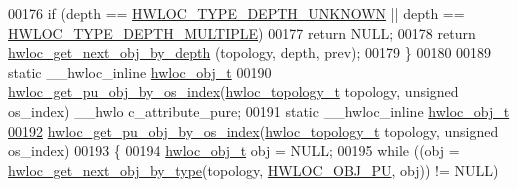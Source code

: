 \begin{DoxyCode}
00176   \textcolor{keywordflow}{if} (depth == \hyperlink{a00046_ggaf4e663cf42bbe20756b849c6293ef575a0565ab92ab72cb0cec91e23003294aad}{HWLOC_TYPE_DEPTH_UNKNOWN} || depth == \hyperlink{a00046_ggaf4e663cf42bbe20756b849c6293ef575ae99465995cacde6c210d5fc2e409798c}{HWLOC_TYPE_DEPTH_MULTIPLE})
00177     \textcolor{keywordflow}{return} NULL;
00178   \textcolor{keywordflow}{return} \hyperlink{a00053_gab7c1dce3f42ece5bfa621e87cf332418}{hwloc_get_next_obj_by_depth} (topology, depth, prev);
00179 \}
00180 
00189 \textcolor{keyword}{static} \_\_hwloc\_inline \hyperlink{a00016}{hwloc_obj_t}
00190 \hyperlink{a00053_ga0bc54225b65d557c70c7cb5dfb714de7}{hwloc_get_pu_obj_by_os_index}(\hyperlink{a00039_ga9d1e76ee15a7dee158b786c30b6a6e38}{hwloc_topology_t} topology, \textcolor{keywordtype}{unsigned} os\_index) \_\_hwlo
      c\_attribute\_pure;
00191 \textcolor{keyword}{static} \_\_hwloc\_inline \hyperlink{a00016}{hwloc_obj_t}
\hypertarget{a00031_source_l00192}{}\hyperlink{a00053_ga0bc54225b65d557c70c7cb5dfb714de7}{00192} \hyperlink{a00053_ga0bc54225b65d557c70c7cb5dfb714de7}{hwloc_get_pu_obj_by_os_index}(\hyperlink{a00039_ga9d1e76ee15a7dee158b786c30b6a6e38}{hwloc_topology_t} topology, \textcolor{keywordtype}{unsigned} os\_index)
00193 \{
00194   \hyperlink{a00016}{hwloc_obj_t} obj = NULL;
00195   \textcolor{keywordflow}{while} ((obj = \hyperlink{a00053_ga5f08ceb69375341e73563cfe2e77534e}{hwloc_get_next_obj_by_type}(topology, \hyperlink{a00041_ggacd37bb612667dc437d66bfb175a8dc55abca6887e80cb291353b0a0c1da83f661}{HWLOC_OBJ_PU}, obj)) != NULL)
      

\end{DoxyCode}
